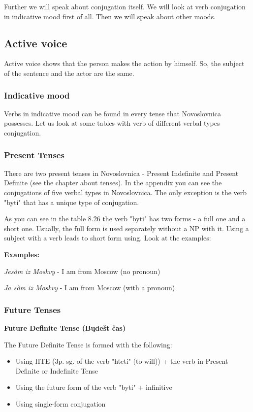 Further we will speak about conjugation itself. We will look at verb conjugation in indicative mood first of all. Then we will speak about other moods.

\subsection{Active voice}

Active voice shows that the person makes the action by himself. So, the subject of the sentence and the actor are the same.

\subsubsection{Indicative mood}

Verbs in indicative mood can be found in every tense that Novoslovnica possesses. Let us look at some tables with verb of different verbal types conjugation.

\subsubsection{Present Tenses}

There are two present tenses in Novoslovnica - Present Indefinite and Present Definite (see the chapter about tenses). In the appendix you can see the conjugations of five verbal types in Novoslovnica. The only exception is the verb "byti" that has a unique type of conjugation.

As you can see in the table 8.26 the verb "byti" has two forms - a full one and a short one. Usually, the full form is used separately without a NP with it. Using a subject with a verb leads to short form using. Look at the examples:

\textbf{Examples:}

\textit{Jesòm iz Moskvy} - I am from Moscow (no pronoun)

\textit{Ja sòm iz Moskvy} - I am from Moscow (with a pronoun) 

\subsubsection{Future Tenses}

\textbf{Future Definite Tense (Bųdešt čas)}

The Future Definite Tense is formed with the following:

\begin{itemize}
	\item Using HTE (3p. sg. of the verb "hteti" (to will)) + the verb in Present Definite or Indefinite Tense
	\item Using the future form of the verb "byti" + infinitive
	\item Using single-form conjugation 
\end{itemize}

